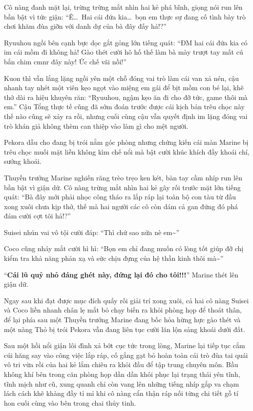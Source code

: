 \documentclass[../main.tex]{subfiles}
\begin{document}
Cô nàng đanh mặt lại, trừng trừng mắt nhìn hai kẻ phá bĩnh, giọng nói run lên bần bật vì tức giận: ``Ê\dots\ Hai cái đứa kia\dots\ bọn em thực sự đang cố tình bày trò chơi khăm đùa giỡn với danh dự của bà đây đấy hả!?''

Ryuuhou ngồi bên cạnh bực dọc gắt gỏng lớn tiếng quát: ``ĐM hai cái đứa kia có im cái mồm đi không hả! Gào thét cười hô hố thế làm bà mày trượt tay mất cú bắn chim cmnr đây này! Ức chế vãi nồi!''

Kuon thì vẫn lẳng lặng ngồi yên một chỗ đóng vai trò làm cái van xả nén, cậu nhanh tay nhét một viên kẹo ngọt vào miệng em gái để bịt mồm con bé lại, khẽ thở dài ra hiệu khuyên răn: ``Ryuuhou, ngậm kẹo ăn đi cho đỡ tức, game thôi mà em.'' Cậu Tổng thực tế cũng đã sớm đoán trước được cái kịch bản trêu chọc này thế nào cũng sẽ xảy ra rồi, nhưng cuối cùng cậu vẫn quyết định im lặng đóng vai trò khán giả không thèm can thiệp vào làm gì cho mệt người.

Pekora dẫu cho đang bị trói nằm góc phòng nhưng chứng kiến cái màn Marine bị trêu chọc muối mặt liền không kìm chế nổi mà bật cười khúc khích đầy khoái chí, sướng khoái.

Thuyền trưởng Marine nghiến răng trèo trẹo ken két, bàn tay cầm nhíp run lên bần bật vì giận dữ. Cô nàng trừng mắt nhìn hai kẻ gây rối trước mặt lớn tiếng quát: ``Bà đây mới phải nhọc công tháo ra lắp ráp lại toàn bộ con tàu từ đầu xong xuôi chưa kịp thở, thế mà hai người các cô còn dám cả gan đứng đó phá đám cười cợt tôi hả!?''

Suisei nhún vai vô tội cười đáp: ``Thì chứ sao nữa nè em\~{}''

Coco cũng nháy mắt cười hì hì: ``Bọn em chỉ đang muốn có lòng tốt giúp đỡ chị kiểm tra khả năng phản xạ và sức chịu đựng của hệ thần kinh thôi mà\~{}''

``\textbf{Cái lũ quỷ nhỏ đáng ghét này, đứng lại đó cho tôi!!!}'' Marine thét lên giận dữ.

Ngay sau khi đạt được mục đích quấy rối giải trí xong xuôi, cả hai cô nàng Suisei và Coco liền nhanh chân lẹ mắt bỏ chạy biến ra khỏi phòng họp để thoát thân, để lại phía sau một Thuyền trưởng Marine đang bốc hỏa hừng hực gào thét và một nàng Thỏ bị trói Pekora vẫn đang liên tục cười lăn lộn sảng khoái dưới đất.

\ct

Sau một hồi nổi giận lôi đình xả bớt cục tức trong lòng, Marine lại tiếp tục cắm cúi hăng say vào công việc lắp ráp, cố gắng gạt bỏ hoàn toàn cái trò đùa tai quái vô tri vừa rồi của hai kẻ lắm chiêu ra khỏi đầu để tập trung chuyên môn. Bầu không khí bên trong căn phòng họp dần dần khôi phục lại trạng thái yên tĩnh, tĩnh mịch như cũ, xung quanh chỉ còn vang lên những tiếng nhíp gắp va chạm lách cách khẽ khàng đầy tỉ mỉ khi cô nàng cẩn thận ráp nối từng chi tiết gỗ tí hon cuối cùng vào bên trong chai thủy tinh.
\end{document}

